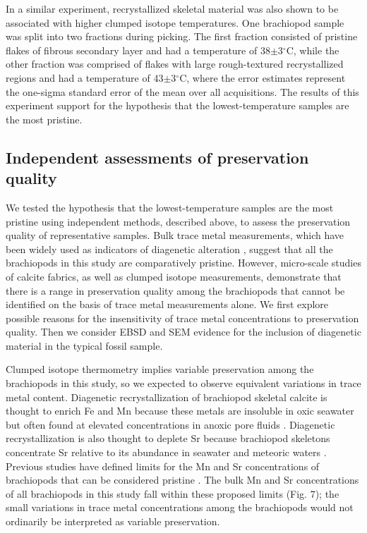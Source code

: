 \documentclass[preprint, authoryear]{elsarticle}
\begin{document}
In a similar experiment, recrystallized skeletal material was also shown to be associated with higher clumped isotope temperatures. One brachiopod sample was split into two fractions during picking. The first fraction consisted of pristine flakes of fibrous secondary layer and had a temperature of 38$\pm$3$^{\circ}$C, while the other fraction was comprised of flakes with large rough-textured recrystallized regions and had a temperature of 43$\pm$3$^{\circ}$C, where the error estimates represent the one-sigma standard error of the mean over all acquisitions. The results of this experiment support for the hypothesis that the lowest-temperature samples are the most pristine.  

\subsection{Independent assessments of preservation quality}

We tested the hypothesis that the lowest-temperature samples are the most pristine using independent methods, described above, to assess the preservation quality of representative samples. Bulk trace metal measurements, which have been widely used as indicators of diagenetic alteration \citep{Azmy1998, Brand2012, Came2007, Finnegan2011}, suggest that all the brachiopods in this study are comparatively pristine. However, micro-scale studies of calcite fabrics, as well as clumped isotope measurements, demonstrate that there is a range in preservation quality among the brachiopods that cannot be identified on the basis of trace metal measurements alone. We first explore possible reasons for the insensitivity of trace metal concentrations to preservation quality. Then we consider EBSD and SEM evidence for the inclusion of diagenetic material in the typical fossil sample. 

Clumped isotope thermometry implies variable preservation among the brachiopods in this study, so we expected to observe equivalent variations in trace metal content. Diagenetic recrystallization of brachiopod skeletal calcite is thought to enrich Fe and Mn because these metals are insoluble in oxic seawater but often found at elevated concentrations in anoxic pore fluids \citep{Brand1980, Shields2003}. Diagenetic recrystallization is also thought to deplete Sr because brachiopod skeletons concentrate Sr relative to its abundance in seawater and meteoric waters \citep{Brand1980, DePaolo2011, Schrag1995}. Previous studies have defined limits for the Mn and Sr concentrations of brachiopods that can be considered pristine \citep{Azmy1998, vanGeldern2006, Korte2005, Mii1999}. The bulk Mn and Sr concentrations of all brachiopods in this study fall within these proposed limits (Fig. 7); the small variations in trace metal concentrations among the brachiopods would not ordinarily be interpreted as variable preservation. 
\end{document}
